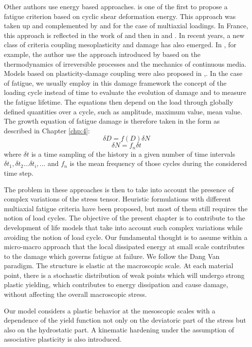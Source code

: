 Other authors use energy based approaches. \cite{ellyin1974criterion} is one of the first to propose a fatigue criterion based on cyclic shear deformation energy. This approach was taken up and complemented by \cite{lefebvre1981cognitive} and \cite{ellyin1991phase} for the case of multiaxial loadings. In France, this approach is reflected in the work of \cite{Froustey1992} and then in \cite{palin1996fatigue} and \cite{banvillet2001prevision}. In recent years, a new class of criteria coupling mesoplasticity and damage has also emerged. In \cite{lemaitre1999two}, for example, the author use the approach introduced by \cite{lemaitre1985mecanique} based on the thermodynamics of irreversible processes and the mechanics of continuous media.   Models based on plasticity-damage coupling were also proposed in \cite{flaceliere2004contribution},\cite{monchiet2006contributions}. In the case of fatigue, we usually employ in this damage framework the concept of the loading cycle instead of time to evaluate the evolution of damage and to measure the fatigue lifetime. The equations then depend on the load through globally defined quantities over a cycle, such as amplitude, maximum value, mean value. The growth equation of fatigue damage is therefore taken in the form as described in Chapter \ref{chp:4}:
$$\delta D=f(D)\delta N$$
$$\delta N=f_n\delta t$$
where $\delta t$ is a time sampling of the history in a given number of time intervals $\delta t_1,\delta t_2 ... \delta t_i, ...$ and $f_n$ is the mean frequency of those cycles during the considered time step.

The problem in these approaches is then to take into account the presence of complex variations of the stress tensor. Heuristic formulations with different multiaxial fatigue criteria have been proposed, but most of them still requires the notion of load cycles. The objective of the present chapter is to contribute to the development of life models that take into account such complex variations while avoiding the notion of load cycle. Our fundamental thought is to assume within a micro-macro approach that the local dissipated energy at small scale contributes to the damage which governs fatigue at failure. We follow the Dang Van paradigm. The structure is elastic  at the macroscopic scale. At each material point, there is a stochastic distribution of weak points which will undergo strong plastic yielding, which contributes to energy dissipation and cause damage, without affecting the overall macroscopic stress.

Our model considers a plastic behavior at the mesoscopic scales  with a dependence of the yield function not only on the deviatoric part of the stress but also on the hydrostatic part. A kinematic hardening under the assumption of associative plasticity is also introduced.

